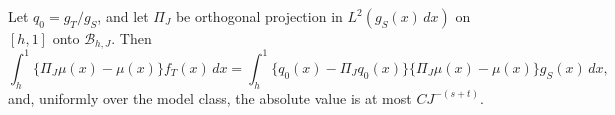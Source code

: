 Let \(q_0=g_T/g_S\), and let \(\Pi_J\) be orthogonal projection in \(L^2(g_S(x)\,dx)\) on \([h,1]\) onto \(\mathcal B_{h,J}\). Then
\[
\int_h^1\{\Pi_J\mu(x)-\mu(x)\}f_T(x)\,dx
=\int_h^1\{q_0(x)-\Pi_Jq_0(x)\}\{\Pi_J\mu(x)-\mu(x)\}g_S(x)\,dx,
\]
and, uniformly over the model class, the absolute value is at most \(CJ^{-(s+t)}\).